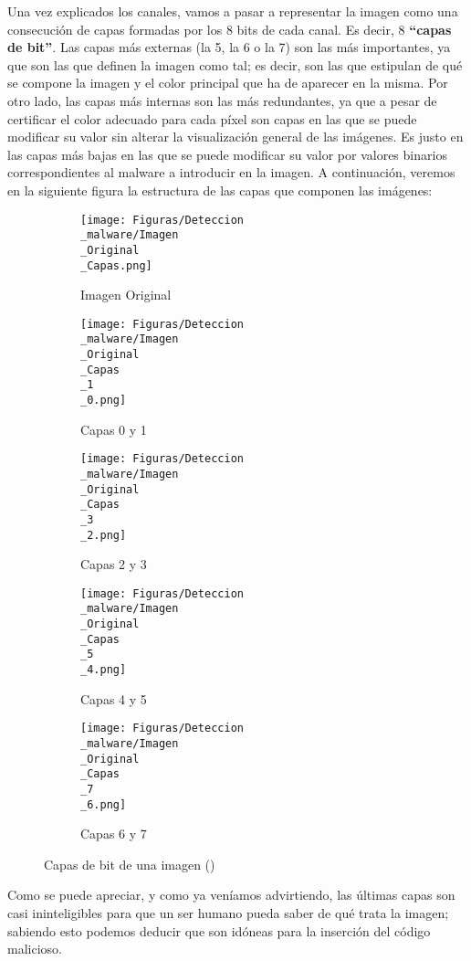 Una vez explicados los canales, vamos a pasar a representar la imagen como una consecución de capas formadas por los 8 bits de cada canal. Es decir, 8 \textbf{``capas de bit''}. Las capas más externas (la 5, la 6 o la 7) son las más importantes, ya que son las que definen la imagen como tal; es decir, son las que estipulan de qué se compone la imagen y el color principal que ha de aparecer en la misma. Por otro lado, las capas más internas son las más redundantes, ya que a pesar de certificar el color adecuado para cada píxel son capas en las que se puede modificar su valor sin alterar la visualización general de las imágenes. Es justo en las capas más bajas en las que se puede modificar su valor por valores binarios correspondientes al malware a introducir en la imagen. A continuación, veremos en la siguiente figura la estructura de las capas que componen las imágenes:

\begin{figure}[H]
  \centering
  \begin{subfigure}[H]{0.5\linewidth}
  	\texttt{[image: Figuras/Deteccion\\\_malware/Imagen\\\_Original\\\_Capas.png]}
  	\label{fig:Capas}
  	\caption{Imagen Original}
  \end{subfigure}
  \begin{subfigure}[H]{0.5\linewidth}
  	\texttt{[image: Figuras/Deteccion\\\_malware/Imagen\\\_Original\\\_Capas\\\_1\\\_0.png]}
  	\label{fig:Capas23}
  \caption{Capas 0 y 1}
  \end{subfigure}
  \begin{subfigure}[H]{0.5\linewidth}
  	\texttt{[image: Figuras/Deteccion\\\_malware/Imagen\\\_Original\\\_Capas\\\_3\\\_2.png]}
  	\label{fig:Capas23}
  	\caption{Capas 2 y 3}
  \end{subfigure}
  \begin{subfigure}[H]{0.5\linewidth}
  	\texttt{[image: Figuras/Deteccion\\\_malware/Imagen\\\_Original\\\_Capas\\\_5\\\_4.png]}
  	\label{fig:Capas45}
  \caption{Capas 4 y 5}
  \end{subfigure}
  \begin{subfigure}[H]{0.5\linewidth}
  	\texttt{[image: Figuras/Deteccion\\\_malware/Imagen\\\_Original\\\_Capas\\\_7\\\_6.png]}
  	\label{fig:Capas67}
  \caption{Capas 6 y 7}
  \end{subfigure}
  \caption{Capas de bit de una imagen (\cite{stegosploit})}
\end{figure}

Como se puede apreciar, y como ya veníamos advirtiendo, las últimas capas son casi ininteligibles para que un ser humano pueda saber de qué trata la imagen; sabiendo esto podemos deducir que son idóneas para la inserción del código malicioso.

